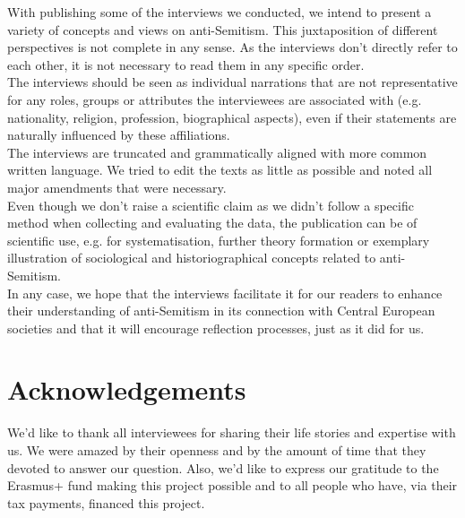 With publishing some of the interviews we conducted, we intend to present a variety of concepts and views on anti-Semitism. This juxtaposition of different perspectives is not complete in any sense. As the interviews don’t directly refer to each other, it is not necessary to read them in any specific order.\\ 
The interviews should be seen as individual narrations that are not representative for any roles, groups or attributes the interviewees are associated with (e.g. nationality, religion, profession, biographical aspects), even if their statements are naturally influenced by these affiliations. \\
The interviews are truncated and grammatically aligned with more common written language. We tried to edit the texts as little as possible and noted all major amendments that were necessary. \\
Even though we don’t raise a scientific claim as we didn’t follow a specific method when collecting and evaluating the data, the publication can be of scientific use, e.g. for systematisation, further theory formation or exemplary illustration of sociological and historiographical concepts related to anti-Semitism. \\
In any case, we hope that the interviews facilitate it for our readers to enhance their understanding of anti-Semitism in its connection with Central European societies and that it will encourage reflection processes, just as it did for us. 

 \section*{Acknowledgements}

We’d like to thank all interviewees for sharing their life stories and expertise with us. We were amazed by their openness and by the amount of time that they devoted to answer our question. Also, we'd like to express our gratitude to the Erasmus+ fund making this project possible and to all people who have, via their tax payments, financed this project. 
